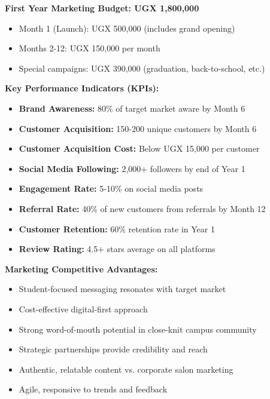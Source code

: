 \documentclass[a4paper,12pt]{article}
\begin{document}
\textbf{First Year Marketing Budget: UGX 1,800,000}
\begin{itemize}[leftmargin=2em]
    \item Month 1 (Launch): UGX 500,000 (includes grand opening)
    \item Months 2-12: UGX 150,000 per month
    \item Special campaigns: UGX 390,000 (graduation, back-to-school, etc.)
\end{itemize}

\vspace{1em}

\begin{tcolorbox}[mybox, title=\textbf{Marketing Strategy Success Metrics}]
\textbf{Key Performance Indicators (KPIs):}
\begin{itemize}[leftmargin=1em, itemsep=0pt]
    \item \textbf{Brand Awareness:} 80\% of target market aware by Month 6
    \item \textbf{Customer Acquisition:} 150-200 unique customers by Month 6
    \item \textbf{Customer Acquisition Cost:} Below UGX 15,000 per customer
    \item \textbf{Social Media Following:} 2,000+ followers by end of Year 1
    \item \textbf{Engagement Rate:} 5-10\% on social media posts
    \item \textbf{Referral Rate:} 40\% of new customers from referrals by Month 12
    \item \textbf{Customer Retention:} 60\% retention rate in Year 1
    \item \textbf{Review Rating:} 4.5+ stars average on all platforms
\end{itemize}

\textbf{Marketing Competitive Advantages:}
\begin{itemize}[leftmargin=1em, itemsep=0pt]
    \item Student-focused messaging resonates with target market
    \item Cost-effective digital-first approach
    \item Strong word-of-mouth potential in close-knit campus community
    \item Strategic partnerships provide credibility and reach
    \item Authentic, relatable content vs. corporate salon marketing
    \item Agile, responsive to trends and feedback
\end{itemize}
\end{tcolorbox}
\end{document}
